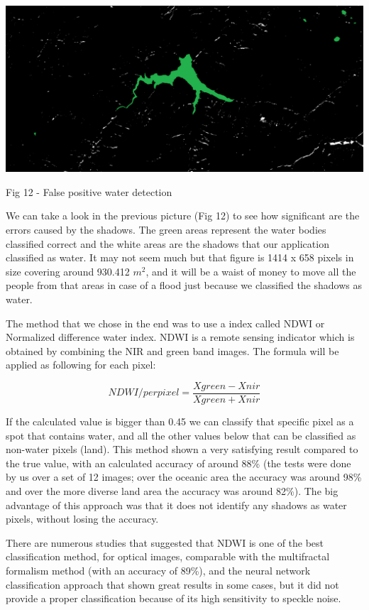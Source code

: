 \documentclass[12pt, a4paper]{report}
\begin{document}
\bigskip
\includegraphics[scale=0.4, left]{water-false-positive.png}
\begin{center}
Fig 12 - False positive water detection
\end{center}
\par 

We can take a look in the previous picture (Fig 12) to see how significant are the errors caused by the shadows. The green areas represent the water bodies classified correct and the white areas are the shadows that our application classified as water. It may not seem much but that figure is 1414 x 658 pixels in size covering around 930.412 $m^2$, and it will be a waist of money to move all the people from that areas in case of a flood just because we classified the shadows as water.
\par 

The method that we chose in the end was to use a index called NDWI or Normalized difference water index. NDWI is a remote sensing indicator which is obtained by combining the NIR and green band images. The formula will be applied as following for each pixel:

$$ NDWI/perpixel = \frac{Xgreen - Xnir}{Xgreen + Xnir}$$

If the calculated value is bigger than 0.45 we can classify that specific pixel as a spot that contains water, and all the other values below that can be classified as non-water pixels (land). This method shown a very satisfying result compared to the true value, with an calculated accuracy of around 88\% (the tests were done by us over a set of 12 images; over the oceanic area the accuracy was around 98\% and over the more diverse land area the accuracy was around 82\%). The big advantage of this approach was that it does not identify any shadows as water pixels, without losing the accuracy. 
\par 
There are numerous studies \cite{NDWI, NDWI Comparison} that suggested that NDWI is one of the best classification method, for optical images, comparable with the multifractal formalism method (with an accuracy of 89\%), and the neural network classification approach that shown great results in some cases, but it did not provide a proper classification because of its high sensitivity to speckle noise.
\par 
\end{document}
